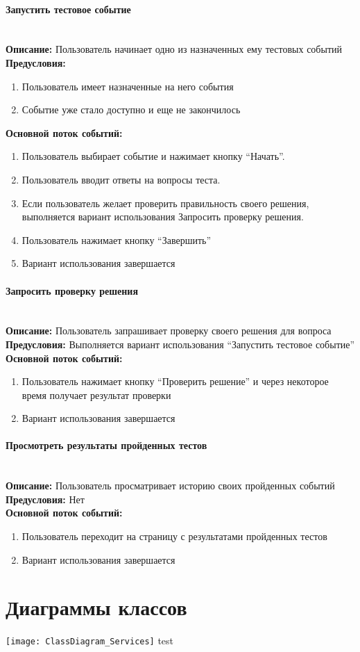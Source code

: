 \documentclass{article}
\newcommand{\paragraphline}[1]{\paragraph{#1}\mbox{}\\}
\begin{document}
    \paragraphline{Запустить тестовое событие}
    \textbf{Описание:} Пользователь начинает одно из назначенных ему тестовых событий\\
    \textbf{Предусловия:} 
    \begin{enumerate}
        \item Пользователь имеет назначенные на него события
        \item Событие уже стало доступно и еще не закончилось
    \end{enumerate}
    
    \textbf{Основной поток событий:}
    \begin{enumerate}
        \item Пользователь выбирает событие и нажимает кнопку “Начать”.
        \item Пользователь вводит ответы на вопросы теста.
        \item Если пользователь желает проверить правильность своего решения, выполняется вариант использования Запросить проверку решения.
        \item Пользователь нажимает кнопку “Завершить”
        \item Вариант использования завершается    
    \end{enumerate}

    \paragraphline{Запросить проверку решения}
    \textbf{Описание:} Пользователь запрашивает проверку своего решения для вопроса\\
    \textbf{Предусловия:} Выполняется вариант использования “Запустить тестовое событие”\\
    \textbf{Основной поток событий:}
    \begin{enumerate}
        \item Пользователь нажимает кнопку “Проверить решение” и через некоторое время получает результат проверки
        \item Вариант использования завершается
    \end{enumerate}

    \paragraphline{Просмотреть результаты пройденных тестов}
    \textbf{Описание:} Пользователь просматривает историю своих пройденных событий\\
    \textbf{Предусловия:} Нет\\
    \textbf{Основной поток событий:}
    \begin{enumerate}
        \item Пользователь переходит на страницу с результатами пройденных тестов
        \item Вариант использования завершается
    \end{enumerate}

    \section{Диаграммы классов}
    \texttt{[image: ClassDiagram\_Services]}
    test
    \pagebreak
\end{document}
